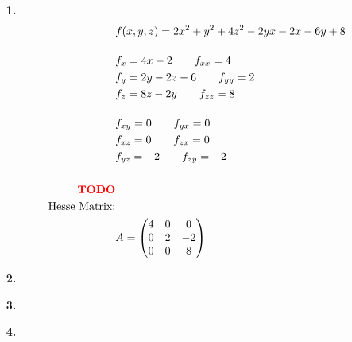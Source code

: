 \documentclass[a4paper,11pt]{article}
\title{\titleinfo}
\author{\authorinfotitle}
\date{\today}
\begin{document}
\maketitle
    \begin{enumerate}

            \item[\textbf{1.}]
            \begin{align*}
                &f(x,y,z) = 2x^2+y^2+4z^2-2yx-2x-6y+8 \\[0.4cm]
                &f_x = 4x -2 \qquad f_{xx} = 4 \\
                &f_y = 2y -2z -6 \qquad f_{yy} = 2\\
                &f_z = 8z -2y \qquad f_{zz} = 8 \\[0.4cm]
                &f_{xy} = 0 \qquad f_{yx} = 0 \\
                &f_{xz} = 0 \qquad f_{zx} = 0 \\
                &f_{yz} = -2 \qquad f_{zy} = -2 \\ \\
                \textbf{\textcolor{red}{TODO}} \\
                \text{Hesse Matrix:} \\
                &A = \begin{pmatrix}
                	 4 & 0 & 0 \\
                	 0 & 2 & -2 \\
                	 0 & 0 & 8 \\
                \end{pmatrix}
            \end{align*}


            \item[\textbf{2.}]


            \item[\textbf{3.}]


            \item[\textbf{4.}]


    \end{enumerate}
\end{document}
